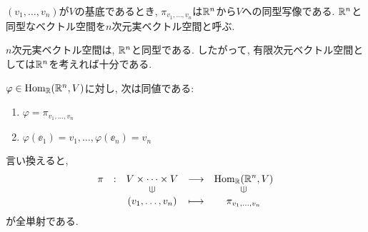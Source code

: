 \begin{remark}
  $(v_1,\ldots,v_n)$が$V$の基底であるとき,
  $\pi_{v_1,\ldots,v_n}$は$\mathbb{R}^n$から$V$への同型写像である.
  $\mathbb{R}^n$と同型なベクトル空間を$n$次元実ベクトル空間と呼ぶ.
\end{remark}

\begin{remark}
  $n$次元実ベクトル空間は,
  $\mathbb{R}^n$と同型である.
  したがって,
  有限次元ベクトル空間としては$\mathbb{R}^n$を考えれば十分である.
\end{remark}
\begin{remark}
  $\varphi \in \operatorname{Hom}_{\mathbb{R}}(\mathbb{R}^n,V)$に対し,
  次は同値である:
  \begin{enumerate}
  \item $\varphi=\pi_{v_1,\ldots,v_n}$
  \item $\varphi(\ee_1)=v_1,\ldots,\varphi(\ee_n)=v_n$
  \end{enumerate}
  言い換えると,
  \begin{align*}
    \shazo{\pi}
          {V\times\cdots \times V}{\Hom_\RR(\RR^n,V)}
          {(v_1,\ldots,v_n)}{\pi_{v_1,\ldots,v_n}}
  \end{align*}
  が全単射である.
\end{remark}

